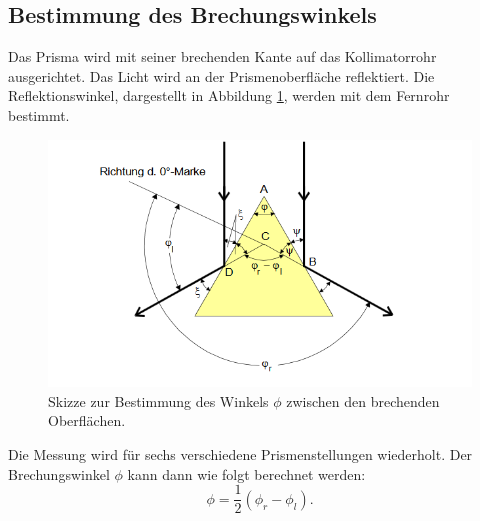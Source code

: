 \subsection{Bestimmung des Brechungswinkels}
Das Prisma wird mit seiner brechenden Kante auf das Kollimatorrohr ausgerichtet.
Das Licht wird an der Prismenoberfläche reflektiert.
Die Reflektionswinkel, dargestellt in Abbildung \ref{fig:phi}, werden mit dem Fernrohr bestimmt.
\begin{figure}[H]
  \centering
  \includegraphics[width=\textwidth]{content/phi.png}
  \caption{Skizze zur Bestimmung des Winkels $\phi$ zwischen den brechenden Oberflächen\cite{v402}.}
  \label{fig:phi}
\end{figure}
\noindent Die Messung wird für sechs verschiedene Prismenstellungen wiederholt.
Der Brechungswinkel $\phi$ kann dann wie folgt berechnet werden:
\begin{equation}
  \label{eq:phi}
  \phi = \frac{1}{2}(\phi_r -\phi_l) .
\end{equation}
